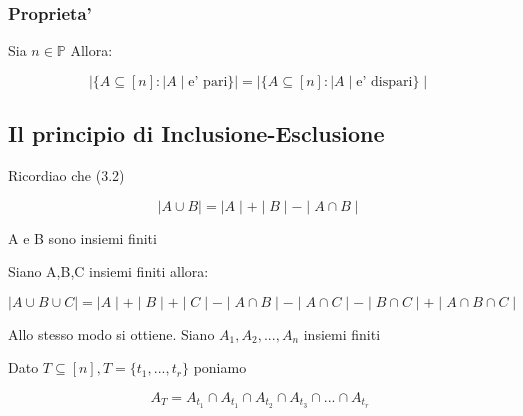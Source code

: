 \documentclass{article}
\begin{document}
        \subsubsection{Proprieta'}
        \begin{flushleft}
          Sia $n \in \mathbb{P}$ Allora:
        \end{flushleft}
        \begin{equation}
          \mid \{ A \subseteq [n]: \mid A \mid \textrm{e' pari} \} \mid = \mid \{ A \subseteq [n]: \mid A \mid \textrm{e' dispari} \} \mid 
        \end{equation}
        \subsection{Il principio di Inclusione-Esclusione}
        \begin{flushleft}
          Ricordiao che (3.2)
        \end{flushleft}
        \begin{equation}
          \mid A \cup B \mid = \mid A \mid + \mid B \mid - \mid A \cap B \mid
        \end{equation}
        \begin{flushleft}
          A e B sono insiemi finiti
        \end{flushleft}
        \begin{flushleft}
          Siano A,B,C insiemi finiti allora:
        \end{flushleft}
        \begin{equation}
          \mid A \cup B \cup C \mid = \mid A \mid + \mid B \mid + \mid C \mid - \mid A \cap B \mid -\mid A \cap C \mid -\mid B \cap C \mid + \mid A \cap B \cap C \mid
        \end{equation}
        \begin{flushleft}
          Allo stesso modo si ottiene. Siano $A_1, A_2,..., A_n$ insiemi finiti 
        \end{flushleft}
        \begin{flushleft}
          Dato $T \subseteq [n], T=\{ t_1,...,t_r \}$ poniamo 
        \end{flushleft}
        \begin{equation}
          A_T= A_{t_{1}} \cap A_{t_{1}} \cap A_{t_{2}} \cap A_{t_{3}} \cap...\cap A_{t_{r}}
        \end{equation}
\end{document}
